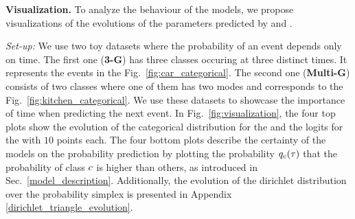 \textbf{Visualization.} To analyze the behaviour of the models, we propose visualizations of the evolutions of the parameters predicted by \DirModel and \GPModel.

\textit{Set-up:} We use two toy datasets where the probability of an event depends only on time. The first one (\textbf{3-G}) has three classes occuring at three distinct times. It represents the events in the Fig.\ \ref{fig:car_categorical}. The second one (\textbf{Multi-G}) consists of two classes where one of them has two modes and corresponds to the Fig.\ \ref{fig:kitchen_categorical}. We use these datasets to showcase the importance of time when predicting the next event. In Fig.\ \ref{fig:visualization}, the four top plots show the evolution of the categorical distribution for the \DirModel and the logits for the \GPModel with $10$ points each. The four bottom plots describe the certainty of the models on the probability prediction by plotting the probability $q_c(\tau)$ that the probability of class $c$ is higher than others, as introduced in Sec.\ \ref{model_description}.
Additionally, the evolution of the dirichlet distribution over the probability simplex is presented in Appendix \ref{dirichlet_triangle_evolution}.

